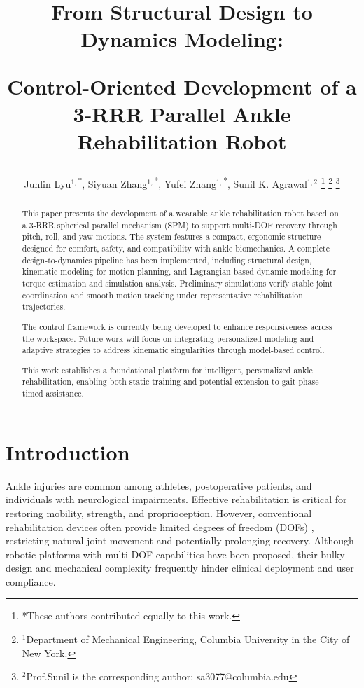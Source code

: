 \documentclass[letterpaper, 10 pt, conference]{ieeeconf}  %
\title{\LARGE \bf
From Structural Design to Dynamics Modeling: 

Control-Oriented Development of a 3-RRR Parallel Ankle Rehabilitation Robot
}
\author{Junlin Lyu$^{1,}$\textsuperscript{*}, Siyuan Zhang$^{1,}$\textsuperscript{*}, Yufei Zhang$^{1,}$\textsuperscript{*}, Sunil K. Agrawal$^{1, 2}$%
\thanks{*These authors contributed equally to this work.}%
\thanks{$^{1}$Department of Mechanical Engineering, 
        Columbia University in the City of New York.}%
\thanks{$^{2}$Prof.Sunil is the corresponding author: sa3077@columbia.edu}%
}
\begin{document}
\maketitle
\thispagestyle{empty}
\pagestyle{empty}


\begin{abstract}

This paper presents the development of a wearable ankle rehabilitation robot based on a 3-RRR spherical parallel mechanism (SPM) to support multi-DOF recovery through pitch, roll, and yaw motions. The system features a compact, ergonomic structure designed for comfort, safety, and compatibility with ankle biomechanics. A complete design-to-dynamics pipeline has been implemented, including structural design, kinematic modeling for motion planning, and Lagrangian-based dynamic modeling for torque estimation and simulation analysis. Preliminary simulations verify stable joint coordination and smooth motion tracking under representative rehabilitation trajectories.

The control framework is currently being developed to enhance responsiveness across the workspace. Future work will focus on integrating personalized modeling and adaptive strategies to address kinematic singularities through model-based control.

This work establishes a foundational platform for intelligent, personalized ankle rehabilitation, enabling both static training and potential extension to gait-phase-timed assistance.

\end{abstract}


\section{Introduction}

Ankle injuries are common among athletes, postoperative patients, and individuals with neurological impairments. Effective rehabilitation is critical for restoring mobility, strength, and proprioception. However, conventional rehabilitation devices often provide limited degrees of freedom (DOFs) \cite{dong2021state}, restricting natural joint movement and potentially prolonging recovery. Although robotic platforms with multi-DOF capabilities have been proposed, their bulky design and mechanical complexity frequently hinder clinical deployment and user compliance.
\end{document}

